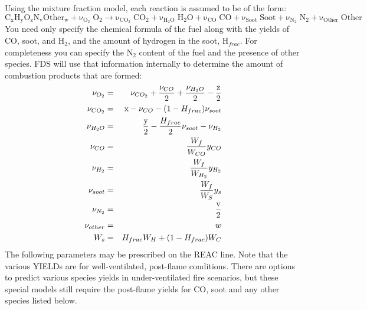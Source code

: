 \documentclass[11pt]{book}
\newcommand{\be}{\begin{equation}}
\newcommand{\ee}{\end{equation}}
\begin{document}
Using the mixture fraction model, each reaction is assumed to be of the form:
\be \mathrm{C_xH_yO_zN_vOther_w + \nu_{O_2} \; O_2 \rightarrow
    \nu_{CO_2} \; CO_2 + \nu_{H_2O} \; H_2O +
    \nu_{CO}   \; CO   + \nu_{Soot} \; Soot + \nu_{N_2} \; N_2 + \nu_{Other} \; Other } \ee
You need only specify the chemical formula of the fuel along with
the yields of CO, soot, and H$_2$, and the amount of hydrogen in the soot, H$_{frac}$.
For completeness you can specify the N$_2$ content of
the fuel and the presence of other species. FDS will use that information internally to
determine the amount of combustion products that are formed:
\begin{eqnarray*}
\nu_{O_2} &=& \nu_{CO_2} + \frac{\nu_{CO}}{2} + \frac{\nu_{H_2O}}{2} - \frac{\hbox{z}}{2} \\
\nu_{CO_2} &=& \hbox{x} - \nu_{CO} - (1-H_{frac}) \nu_{soot}  \\
\nu_{H_2O} &=& \frac{\hbox{y}}{2} - \frac{H_{frac}}{2} \nu_{soot} - \nu_{H_2} \\
\nu_{CO}   &=& \frac{W_f}{W_{CO}} y_{CO} \\
\nu_{H_2}  &=& \frac{W_f}{W_{H_2}} y_{H_2} \\
\nu_{soot} &=& \frac{W_f}{W_S} y_s \\
\nu_{N_2} &=& \frac{\hbox{v}}{2} \\
\nu_{other} &=& w\\
W_s &=& H_{frac} W_H + (1-H_{frac}) W_C
\end{eqnarray*}
The following parameters may be prescribed on the {\ct REAC} line.
Note that the various {\ct YIELD}s are for well-ventilated, post-flame conditions. There are options to
predict various species yields in under-ventilated fire scenarios, but these special models still require
the post-flame yields for CO, soot and any other species listed below.
\end{document}

